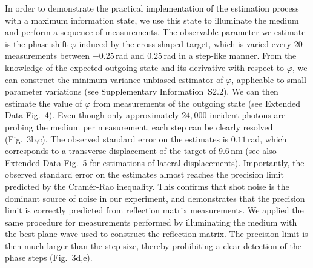 \documentclass[aps,pra,twocolumn,amsmath,amssymb,superscriptaddress,10pt,nobibnotes]{revtex4-2}
\begin{document}
In order to demonstrate the practical implementation of the estimation process with a maximum information state, we use this state to illuminate the medium and perform a sequence of measurements. The observable parameter we estimate is the phase shift $\varphi$ induced by the cross-shaped target, which is varied every $20$ measurements between $-0.25$\,rad and $0.25$\,rad in a step-like manner. From the knowledge of the expected outgoing state and its derivative with respect to $\varphi$, we can construct the minimum variance unbiased estimator of $\varphi$, applicable to small parameter variations (see Supplementary Information~S2.2). We can then estimate the value of $\varphi$ from measurements of the outgoing state (see Extended Data Fig.~4). Even though only approximately $24,000$ incident photons are probing the medium per measurement, each step can be clearly resolved (Fig.~3b,c). The observed standard error on the estimates is $0.11$\,rad, which corresponds to a transverse displacement of the target of $9.6$\,nm (see also Extended Data Fig.~5 for estimations of lateral displacements). Importantly, the observed standard error on the estimates almost reaches the precision limit predicted by the Cramér-Rao inequality. This confirms that shot noise is the dominant source of noise in our experiment, and demonstrates that the precision limit is correctly predicted from reflection matrix measurements. We applied the same procedure for measurements performed by illuminating the medium with the best plane wave used to construct the reflection matrix. The precision limit is then much larger than the step size, thereby prohibiting a clear detection of the phase steps (Fig.~3d,e). 
\end{document}
